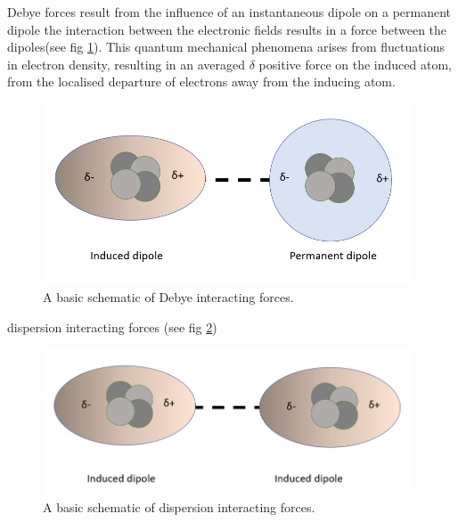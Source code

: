 Debye forces %
result from the influence of an instantaneous dipole on a permanent dipole%
the interaction between the electronic fields results in a force between the dipoles(see fig \ref{fig:debye}). This quantum mechanical phenomena arises from fluctuations %
in electron density, resulting in an averaged $\delta$ positive force on the induced atom, from the localised departure of electrons away from the inducing atom. 

\begin{figure}[h!]     %
        \begin{center}
          \includegraphics[width=110mm]{chapter1/debye.PNG}
\end{center}
\caption{A basic schematic of Debye interacting forces.}
\label{fig:debye}                 %
\end{figure}

dispersion interacting forces (see fig \ref{fig:disp})

\begin{figure}[h]     %
        \begin{center}
          \includegraphics[width=110mm]{chapter1/London.PNG}
\end{center}
\caption{A basic schematic of dispersion interacting forces.}
\label{fig:disp}                 %
\end{figure}

